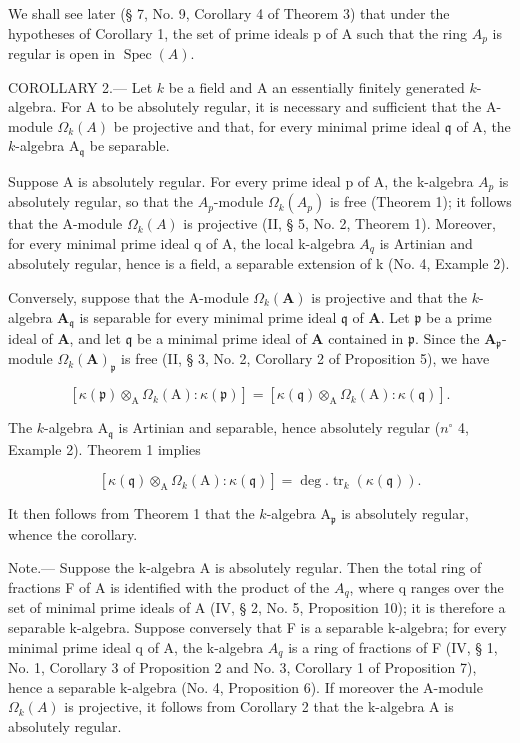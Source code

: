 We shall see later (§ 7, No. 9, Corollary 4 of Theorem 3) that under the hypotheses of Corollary 1, the set of prime ideals p of A such that the ring \(A_{p}\) is regular is open in \(\operatorname{Spec}(A)\).

COROLLARY 2.--- Let \(k\) be a field and A an essentially finitely generated \(k\)-algebra. For A to be absolutely regular, it is necessary and sufficient that the A-module \(\Omega_{k}(A)\) be projective and that, for every minimal prime ideal \(\mathfrak{q}\) of A, the \(k\)-algebra \(\mathrm{A}_{\mathfrak{q}}\) be separable.

Suppose A is absolutely regular. For every prime ideal p of A, the k-algebra \(A_{p}\) is absolutely regular, so that the \(A_{p}\)-module \(\Omega_{k}(A_{p})\) is free (Theorem 1); it follows that the A-module \(\Omega_{k}(A)\) is projective (II, § 5, No. 2, Theorem 1). Moreover, for every minimal prime ideal q of A, the local k-algebra \(A_{q}\) is Artinian and absolutely regular, hence is a field, a separable extension of k (No. 4, Example 2).

Conversely, suppose that the A-module \(\Omega_{k}(\mathbf{A})\) is projective and that the \(k\)-algebra \(\mathbf{A}_{\mathfrak{q}}\) is separable for every minimal prime ideal \(\mathfrak{q}\) of \(\mathbf{A}\). Let \(\mathfrak{p}\) be a prime ideal of \(\mathbf{A}\), and let \(\mathfrak{q}\) be a minimal prime ideal of \(\mathbf{A}\) contained in \(\mathfrak{p}\). Since the \(\mathbf{A}_{\mathfrak{p}}\)-module \(\Omega_{k}(\mathbf{A})_{\mathfrak{p}}\) is free (II, § 3, No. 2, Corollary 2 of Proposition 5), we have

\[
[ \kappa (\mathfrak {p}) \otimes_ {\mathrm{A}} \Omega_ {k} (\mathrm{A}): \kappa (\mathfrak {p}) ] = [ \kappa (\mathfrak {q}) \otimes_ {\mathrm{A}} \Omega_ {k} (\mathrm{A}): \kappa (\mathfrak {q}) ].
\]

The \(k\)-algebra \(\mathrm{A}_{\mathfrak{q}}\) is Artinian and separable, hence absolutely regular (\(n^{\circ}\) 4, Example 2). Theorem 1 implies

\[
[ \kappa (\mathfrak {q}) \otimes_ {\mathrm{A}} \Omega_ {k} (\mathrm{A}): \kappa (\mathfrak {q}) ] = \deg . \operatorname{tr} _ {k} (\kappa (\mathfrak {q})).
\]

It then follows from Theorem 1 that the \(k\)-algebra \(\mathrm{A}_{\mathfrak{p}}\) is absolutely regular, whence the corollary.

Note.--- Suppose the k-algebra A is absolutely regular. Then the total ring of fractions F of A is identified with the product of the \(A_{q}\), where q ranges over the set of minimal prime ideals of A (IV, § 2, No. 5, Proposition 10); it is therefore a separable k-algebra. Suppose conversely that F is a separable k-algebra; for every minimal prime ideal q of A, the k-algebra \(A_{q}\) is a ring of fractions of F (IV, § 1, No. 1, Corollary 3 of Proposition 2 and No. 3, Corollary 1 of Proposition 7), hence a separable k-algebra (No. 4, Proposition 6). If moreover the A-module \(\Omega_{k}(A)\) is projective, it follows from Corollary 2 that the k-algebra A is absolutely regular.

